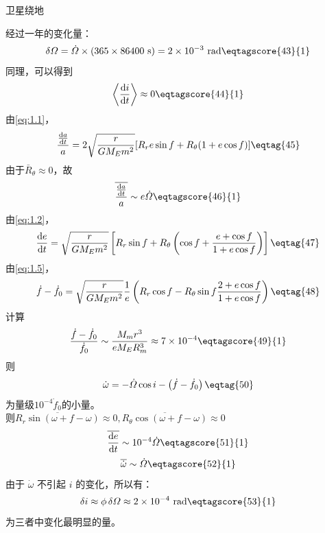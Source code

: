 \documentclass[answer]{cphos}
\begin{document}
\begin{problem}[50]{卫星绕地}
\begin{solution}
\begin{equation}
\end{equation}
经过一年的变化量：
\begin{equation}
	\delta\varOmega=\dot{\varOmega}\times(365\times86400\text{~s})=2\times10^{-3}\text{~rad} \eqtagscore{43}{1}
\end{equation}
同理，可以得到
\begin{equation}
	\left\langle\frac{\mathrm{d}i}{\mathrm{d}t}\right\rangle\approx 0 \eqtagscore{44}{1}
\end{equation}
由\ref{eq:1.1}，
\begin{equation}
	\frac{\frac{\mathrm{d}a}{\mathrm{d}t}}{a}= 2\sqrt{\frac{r}{GM_Em^2}} [R_r e \sin f + R_\theta (1+e \cos f)] \eqtag{45}
\end{equation}
由于$\bar R_\theta\approx0$，故
\begin{equation}
	\overline{\frac{\frac{\mathrm{d}a}{\mathrm{d}t}}{a}}\sim e\dot{\varOmega} \eqtagscore{46}{1}
\end{equation}
由\ref{eq:1.2}，
\begin{equation}
	\frac{\mathrm{d}e}{\mathrm{d}t} = \sqrt{\frac{r}{GM_Em^2}} \left[R_r \sin f + R_\theta \left(\cos f + \frac{e+\cos f}{1+e\cos f}\right)\right] \eqtag{47}
\end{equation}
由\ref{eq:1.5}，
\begin{equation}
	\dot{f}-\dot{f}_0=\sqrt{\frac{r}{GM_Em^2}}\frac{1}{e}\left(R_r\cos f - R_{\theta}\sin f\frac{2+e\cos f}{1+ e\cos f}\right) \eqtag{48}
\end{equation}
计算
\begin{equation}
	\frac{\dot{f}-\dot{f}_0}{\dot{f}_0}\sim \frac{M_{m}r^3}{eM_{E}R_{m}^3}\approx7\times10^{-4}  \eqtagscore{49}{1} \label{eq:2.2}
\end{equation}
则
\begin{equation}
	\dot{\omega}=-\dot{\varOmega}\cos i-\left(\dot{f}-\dot{f}_0\right) \eqtag{50}
\end{equation}
为量级$10^{-4}\dot{f}_0$的小量。\\
则$\overline{R_r\sin\left(\omega+f-\omega\right)}\approx0, \overline{R_\theta\cos\left(\omega+f-\omega\right)}\approx0$
\begin{equation}
	\overline{\frac{\mathrm{d}e}{\mathrm{d}t}}\sim 10^{-4}\dot{\varOmega} \eqtagscore{51}{1}
\end{equation}
\begin{equation}
	\overline{\dot{\omega}}\sim\dot{\varOmega} \eqtagscore{52}{1}
\end{equation}
由于 $\dot{\omega}$ 不引起 $i$ 的变化，所以有：
\begin{equation}
	\delta i\approx\phi\,\delta\varOmega\approx2\times10^{-4}\text{~rad} \eqtagscore{53}{1}
\end{equation}
为三者中变化最明显的量。


\end{solution}
\end{problem}
\end{document}
